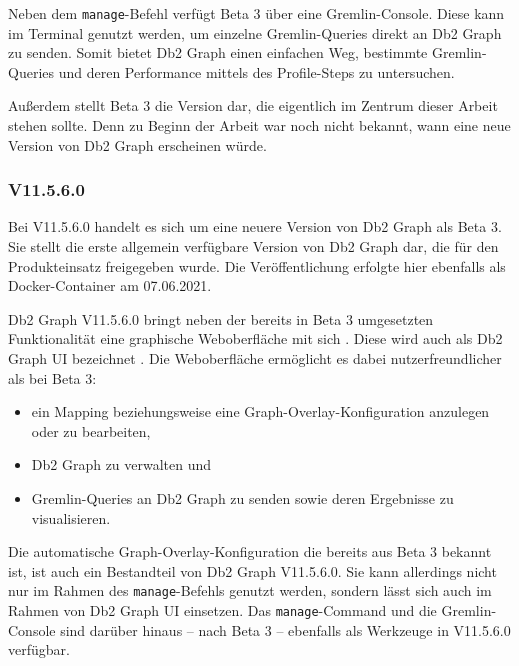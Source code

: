 Neben dem \texttt{manage}-Befehl verfügt Beta 3 über eine Gremlin-Console. Diese kann im Terminal genutzt werden, um einzelne Gremlin-Queries direkt an Db2 Graph zu senden. Somit bietet Db2 Graph einen einfachen Weg, bestimmte Gremlin-Queries und deren Performance mittels des Profile-Steps zu untersuchen.

Außerdem stellt Beta 3 die Version dar, die eigentlich im Zentrum dieser Arbeit stehen sollte. Denn zu Beginn der Arbeit war noch nicht bekannt, wann eine neue Version von Db2 Graph erscheinen würde. 

\subsubsection{V11.5.6.0}

Bei V11.5.6.0 handelt es sich um eine neuere Version von Db2 Graph als Beta 3. Sie stellt die erste allgemein verfügbare Version von Db2 Graph dar, die für den Produkteinsatz freigegeben wurde. Die Veröffentlichung erfolgte hier ebenfalls als Docker-Container am 07.06.2021. 

Db2 Graph V11.5.6.0 bringt neben der bereits in Beta 3 umgesetzten Funktionalität eine graphische Weboberfläche mit sich \cite{ibm_docs_db2_graph_ui}. Diese wird auch als Db2 Graph UI bezeichnet \cite{ibm_docs_db2_graph_ui}. Die Weboberfläche ermöglicht es dabei nutzerfreundlicher als bei Beta 3: 

\begin{itemize}
    \item ein Mapping beziehungsweise eine Graph-Overlay-Konfiguration anzulegen oder zu bearbeiten,
    \item Db2 Graph zu verwalten und 
    \item Gremlin-Queries an Db2 Graph zu senden sowie deren Ergebnisse zu visualisieren. 
\end{itemize}

Die automatische Graph-Overlay-Konfiguration die bereits aus Beta 3 bekannt ist, ist auch ein Bestandteil von Db2 Graph V11.5.6.0. Sie kann allerdings nicht nur im Rahmen des \texttt{manage}-Befehls genutzt werden, sondern lässt sich auch im Rahmen von Db2 Graph UI einsetzen. Das \texttt{manage}-Command und die Gremlin-Console sind darüber hinaus -- nach Beta 3 -- ebenfalls als Werkzeuge in V11.5.6.0 verfügbar.

